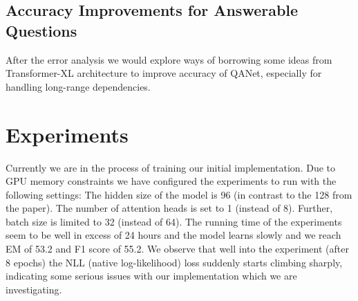 \documentclass{article}
\begin{document}
\subsection{Accuracy Improvements for Answerable Questions} After the error analysis we would explore ways of borrowing some ideas from Transformer-XL architecture \cite{dai2019transformerxl} to improve accuracy of QANet, especially for handling long-range dependencies. 

\section{Experiments}
Currently we are in the process of training our initial implementation. Due to GPU memory constraints we have configured the experiments to run with the following settings: The hidden size of the model is 96 (in contrast to the 128 from the paper). The number of attention heads is set to 1 (instead of 8). Further, batch size is limited to 32 (instead of 64). The running time of the experiments seem to be well in excess of 24 hours and the model learns slowly and we reach EM of 53.2 and F1 score of 55.2. We observe that well into the experiment (after 8 epochs) the NLL (native log-likelihood) loss suddenly starts climbing sharply, indicating some serious issues with our implementation which we are investigating. 
\end{document}
